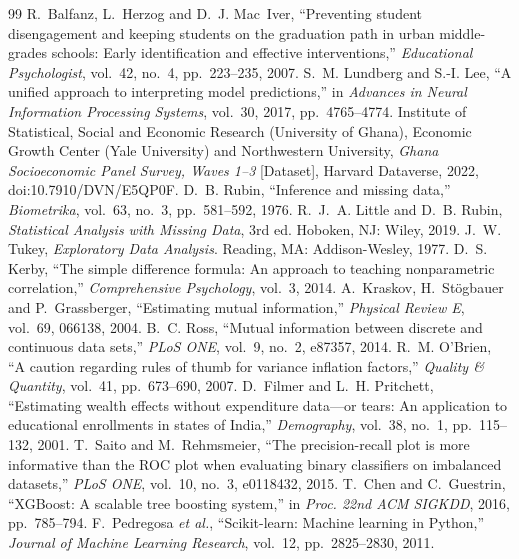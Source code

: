 \documentclass[conference,a4paper]{IEEEtran}
\begin{document}
\clearpage
\begin{thebibliography}{99}
 R.~Balfanz, L.~Herzog and D.~J. Mac~Iver, ``Preventing student disengagement and keeping students on the graduation path in urban middle-grades schools: Early identification and effective interventions,'' \emph{Educational Psychologist}, vol.~42, no.~4, pp.~223--235, 2007.
 S.~M. Lundberg and S.-I. Lee, ``A unified approach to interpreting model predictions,'' in \emph{Advances in Neural Information Processing Systems}, vol.~30, 2017, pp.~4765--4774.
 Institute of Statistical, Social and Economic Research (University of Ghana), Economic Growth Center (Yale University) and Northwestern University, \emph{Ghana Socioeconomic Panel Survey, Waves 1--3} [Dataset], Harvard Dataverse, 2022, doi:10.7910/DVN/E5QP0F.
 D.~B. Rubin, ``Inference and missing data,'' \emph{Biometrika}, vol.~63, no.~3, pp.~581--592, 1976.
 R.~J.~A. Little and D.~B. Rubin, \emph{Statistical Analysis with Missing Data}, 3rd ed. Hoboken, NJ: Wiley, 2019.
 J.~W. Tukey, \emph{Exploratory Data Analysis}. Reading, MA: Addison-Wesley, 1977.
 D.~S. Kerby, ``The simple difference formula: An approach to teaching nonparametric correlation,'' \emph{Comprehensive Psychology}, vol.~3, 2014.
 A.~Kraskov, H.~St\"ogbauer and P.~Grassberger, ``Estimating mutual information,'' \emph{Physical Review E}, vol.~69, 066138, 2004.
 B.~C. Ross, ``Mutual information between discrete and continuous data sets,'' \emph{PLoS ONE}, vol.~9, no.~2, e87357, 2014.
 R.~M. O'Brien, ``A caution regarding rules of thumb for variance inflation factors,'' \emph{Quality \& Quantity}, vol.~41, pp.~673--690, 2007.
 D.~Filmer and L.~H. Pritchett, ``Estimating wealth effects without expenditure data---or tears: An application to educational enrollments in states of India,'' \emph{Demography}, vol.~38, no.~1, pp.~115--132, 2001.
 T.~Saito and M.~Rehmsmeier, ``The precision-recall plot is more informative than the ROC plot when evaluating binary classifiers on imbalanced datasets,'' \emph{PLoS ONE}, vol.~10, no.~3, e0118432, 2015.
 T.~Chen and C.~Guestrin, ``XGBoost: A scalable tree boosting system,'' in \emph{Proc. 22nd ACM SIGKDD}, 2016, pp.~785--794.
 F.~Pedregosa \emph{et al.}, ``Scikit-learn: Machine learning in Python,'' \emph{Journal of Machine Learning Research}, vol.~12, pp.~2825--2830, 2011.

\end{thebibliography}
\end{document}
